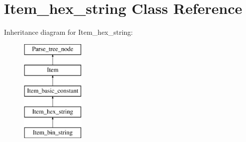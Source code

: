 \hypertarget{classItem__hex__string}{}\section{Item\+\_\+hex\+\_\+string Class Reference}
\label{classItem__hex__string}
Inheritance diagram for Item\+\_\+hex\+\_\+string\+:\begin{figure}[H]
\begin{center}
\leavevmode
\includegraphics[height=5.000000cm]{classItem__hex__string}
\end{center}
\end{figure}
